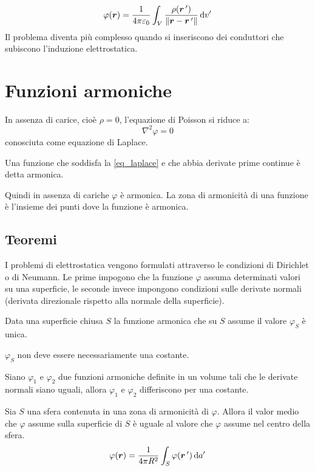 \[\varphi(\boldsymbol{r})=\frac{1}{4\pi\varepsilon_0}\int_V\frac{\rho(\boldsymbol{r}\,')}{\left\lVert\boldsymbol{r}-\boldsymbol{r}\,'\right\rVert}\,\mathrm{d} v'\]
Il problema diventa più complesso quando si inseriscono dei conduttori che subiscono l'induzione elettrostatica.
\section{Funzioni armoniche}
In assenza di carice, cioè $\rho=0$, l'equazione di Poisson si riduce a:
\begin{equation}
  \nabla^2\varphi=0
  \label{eq_laplace}
\end{equation}
conosciuta come equazione di Laplace.
\begin{Def} Una funzione che soddisfa la \eqref{eq_laplace} e che abbia derivate prime continue è detta armonica.
\end{Def}
Quindi in assenza di cariche $\varphi$ è armonica. La zona di armonicità di una funzione è l'insieme dei punti dove la funzione è armonica.
\subsection{Teoremi}
I problemi di elettrostatica vengono formulati attraverso le condizioni di Dirichlet o di Neumann. Le prime impogono che la funzione $\varphi$ assuma determinati valori su una superficie, le seconde invece impongono condizioni sulle derivate normali (derivata direzionale rispetto alla normale della superficie).
\begin{Teo}
  Data una superficie chiusa $S$ la funzione armonica che su $S$ assume il valore $\varphi_S$ è unica.
\end{Teo}
$\varphi_S$ non deve essere necessariamente una costante.
\begin{Teo}
  Siano $\varphi_1$ e $\varphi_2$ due funzioni armoniche definite in un volume tali che le derivate normali siano uguali, allora $\varphi_1$ e $\varphi_2$ differiscono per una costante.
\end{Teo}
\begin{Teo}[media]
  Sia $S$ una sfera contenuta in una zona di armonicità di $\varphi$. Allora il valor medio che $\varphi$ assume sulla superficie di $S$ è uguale al valore che $\varphi$ assume nel centro della sfera.
  \begin{equation}
    \varphi(\boldsymbol{r})=\frac{1}{4\pi R^2}\int_S\varphi(\boldsymbol{r}\,')\,\mathrm{d} a'
  \end{equation}
\end{Teo}

